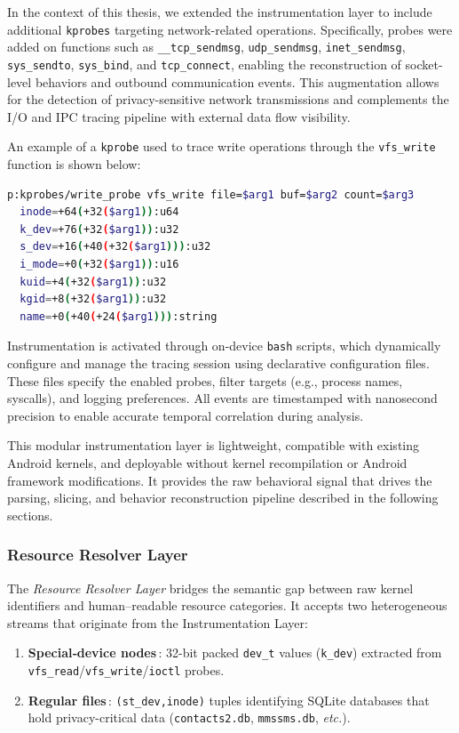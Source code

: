 \documentclass[a4paper,12pt]{report}
\begin{document}
In the context of this thesis, we extended the instrumentation layer to include additional \texttt{kprobes} targeting network-related operations. Specifically, probes were added on functions such as \texttt{\_\_tcp\_sendmsg}, \texttt{udp\_sendmsg}, \texttt{inet\_sendmsg}, \texttt{sys\_sendto}, \texttt{sys\_bind}, and \texttt{tcp\_connect}, enabling the reconstruction of socket-level behaviors and outbound communication events. This augmentation allows for the detection of privacy-sensitive network transmissions and complements the I/O and IPC tracing pipeline with external data flow visibility.

An example of a \texttt{kprobe} used to trace write operations through the \texttt{vfs\_write} function is shown below:

\begin{lstlisting}[language=bash,caption={Example kprobe for vfs\_write in tracefs syntax}]
p:kprobes/write_probe vfs_write file=$arg1 buf=$arg2 count=$arg3
  inode=+64(+32($arg1)):u64
  k_dev=+76(+32($arg1)):u32
  s_dev=+16(+40(+32($arg1))):u32
  i_mode=+0(+32($arg1)):u16
  kuid=+4(+32($arg1)):u32
  kgid=+8(+32($arg1)):u32
  name=+0(+40(+24($arg1))):string
\end{lstlisting}

Instrumentation is activated through on-device \texttt{bash} scripts, which dynamically configure and manage the tracing session using declarative configuration files. These files specify the enabled probes, filter targets (e.g., process names, syscalls), and logging preferences. All events are timestamped with nanosecond precision to enable accurate temporal correlation during analysis.

This modular instrumentation layer is lightweight, compatible with existing Android kernels, and deployable without kernel recompilation or Android framework modifications. It provides the raw behavioral signal that drives the parsing, slicing, and behavior reconstruction pipeline described in the following sections.


\subsubsection{Resource Resolver Layer}

The \emph{Resource Resolver Layer} bridges the semantic gap between
raw kernel identifiers and human–readable resource categories.  It
accepts two heterogeneous streams that originate from the
Instrumentation Layer:

\begin{enumerate}
  \item \textbf{Special‐device nodes}\,: 32-bit packed
        \texttt{dev\_t} values (\texttt{k\_dev}) extracted from
        \texttt{vfs\_read}/\texttt{vfs\_write}/\texttt{ioctl} probes.
  \item \textbf{Regular files}\,: \texttt{(st\_dev,\;inode)} tuples
        identifying SQLite databases that hold privacy-critical data
        (\texttt{contacts2.db}, \texttt{mmssms.db}, \textit{etc.}).
\end{enumerate}
\end{document}
